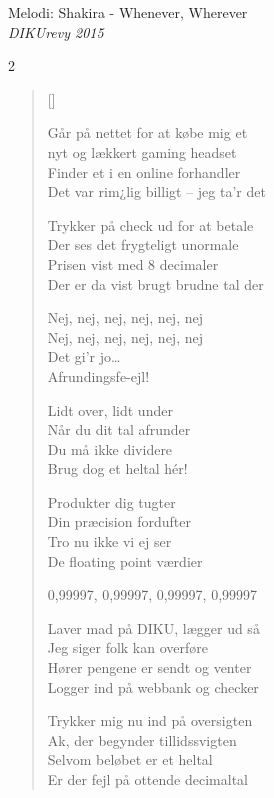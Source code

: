 \newpage


{Melodi: Shakira - Whenever, Wherever}\\[.2em]
{\small\itshape DIKUrevy 2015}
\begin{multicols}2
\settowidth{\versewidth}{Går på nettet for at købe mig et}
\begin{verse}[\versewidth]

        Går på nettet for at købe mig et\\
        nyt og lækkert gaming headset\\
        Finder et i en online forhandler\\
        Det var rim¿lig billigt -- jeg ta'r det

        Trykker på check ud for at betale\\
        Der ses det frygteligt unormale\\
        Prisen vist med 8 decimaler\\
        Der er da vist brugt brudne tal der
    

        Nej, nej, nej, nej, nej, nej\\
        Nej, nej, nej, nej, nej, nej\\
        Det gi'r jo\ldots\\
        Afrundingsfe-ejl!
     

        Lidt over, lidt under\\
        Når du dit tal afrunder\\
        Du må ikke dividere\\
        Brug dog et heltal hér! 

        Produkter dig tugter\\
        Din præcision fordufter\\
        Tro nu ikke vi ej ser\\
        De floating point værdier
    

        0,99997, 0,99997, 0,99997, 0,99997 
    

        Laver mad på DIKU, lægger ud så\\
        Jeg siger folk kan overføre\\
        Hører pengene er sendt og venter\\
        Logger ind på webbank og checker

        Trykker mig nu ind på oversigten\\
        Ak, der begynder tillidssvigten\\
        Selvom beløbet er et heltal\\
        Er der fejl på ottende decimaltal
     


\end{verse}
\end{multicols}
